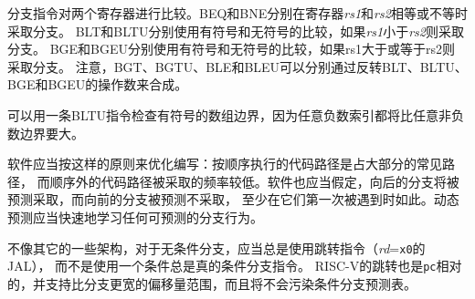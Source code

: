 分支指令对两个寄存器进行比较。BEQ和BNE分别在寄存器{\em rs1}和{\em rs2}相等或不等时采取分支。
BLT和BLTU分别使用有符号和无符号的比较，如果{\em rs1}小于{\em rs2}则采取分支。
BGE和BGEU分别使用有符号和无符号的比较，如果rs1大于或等于rs2则采取分支。
注意，BGT、BGTU、BLE和BLEU可以分别通过反转BLT、BLTU、BGE和BGEU的操作数来合成。

\begin{commentary}

可以用一条BLTU指令检查有符号的数组边界，因为任意负数索引都将比任意非负数边界要大。
\end{commentary}

软件应当按这样的原则来优化编写：按顺序执行的代码路径是占大部分的常见路径，
而顺序外的代码路径被采取的频率较低。软件也应当假定，向后的分支将被预测采取，而向前的分支被预测不采取，
至少在它们第一次被遇到时如此。动态预测应当快速地学习任何可预测的分支行为。

不像其它的一些架构，对于无条件分支，应当总是使用跳转指令（{\em rd}={\tt x0}的JAL），
而不是使用一个条件总是真的条件分支指令。
RISC-V的跳转也是{\tt pc}相对的，并支持比分支更宽的偏移量范围，而且将不会污染条件分支预测表。

